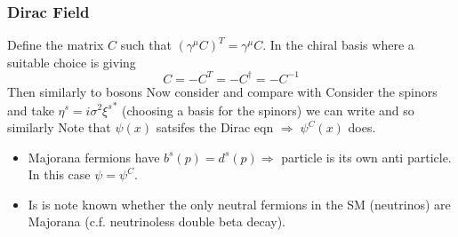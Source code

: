 \documentclass{article}
\begin{document}
\subsubsection*{Dirac Field}
Define the matrix $C$ such that $(\gamma^\mu C)^T = \gamma^\mu C$. In the chiral basis where 
a suitable choice is 
giving 
\[
C = -C^T = -C^\dagger = -C^{-1}
\]
Then 
similarly to bosons 
Now consider 
and compare with 
Consider the spinors and take $\eta^s = i\sigma^2 {\xi^s}^\ast$ (choosing a basis for the spinors) we can write 
and so 
similarly 
Note that $\psi(x)$ satsifes the Dirac eqn $\Rightarrow \; \psi^C(x)$ does. 
\begin{itemize}
    \item Majorana fermions have $b^s(p) = d^s(p) \Rightarrow$ particle is its own anti particle. In this case $\psi = \psi^C$. 
    \item Is is note known whether the only neutral fermions in the SM (neutrinos) are Majorana (c.f. neutrinoless double beta decay). 
\end{itemize}
\end{document}
